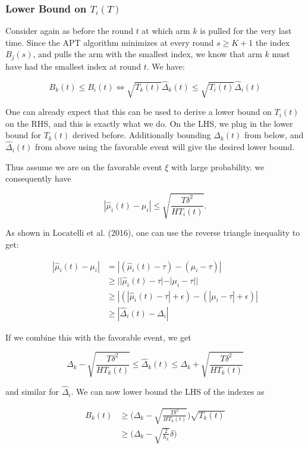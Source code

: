 \documentclass[11pt,]{article}
\begin{document}
\subsubsection{\texorpdfstring{Lower Bound on
\(T_i(T)\)}{Lower Bound on T\_i(T)}}\label{lower-bound-on-t_it}

Consider again as before the round \(t\) at which arm \(k\) is pulled
for the very last time. Since the APT algorithm minimizes at every round
\(s \geq K+1\) the index \(B_j(s)\), and pulls the arm with the smallest
index, we know that arm \(k\) must have had the smallest index at round
\(t\). We have:

\[
B_k(t) \leq B_i(t) \Leftrightarrow \sqrt{T_k(t)}\hat{\Delta}_k(t) \leq \sqrt{T_i(t)} \hat{\Delta}_i(t)
\]

One can already expect that this can be used to derive a lower bound on
\(T_i(t)\) on the RHS, and this is exactly what we do. On the LHS, we
plug in the lower bound for \(T_k(t)\) derived before. Additionally
bounding \(\Delta_k(t)\) from below, and \(\hat{\Delta}_i(t)\) from
above using the favorable event will give the desired lower bound.

Thus assume we are on the favorable event \(\xi\) with large
probability. we consequently have

\[
| \hat{\mu}_i(t) - \mu_i| \leq \sqrt{\frac{T\delta^2}{HT_i(t)}}.
\]

As shown in Locatelli et al. (2016), one can use the reverse triangle
inequality to get:

\begin{align*}
|\hat{\mu}_i(t) - \mu_i| & = |(\hat{\mu}_i(t) - \tau) - (\mu_i - \tau)| \\
& \geq || \hat{\mu}_i(t) - \tau | - |\mu_i - \tau|| \\
& \geq |(|\hat{\mu}_i(t) - \tau| + \epsilon) - (|\mu_i - \tau| + \epsilon)| \\
& \geq |\hat{\Delta}_i(t) - \Delta_i|
\end{align*}

If we combine this with the favorable event, we get

\[
\Delta_k - \sqrt{\frac{T\delta^2}{HT_k(t)}} \leq \hat{\Delta}_k(t) \leq \Delta_k + \sqrt{\frac{T\delta^2}{HT_k(t)}}
\]

and similar for \(\hat{\Delta}_i\). We can now lower bound the LHS of
the indexes as

\begin{align*}
B_k(t) & \geq \Big(\Delta_k - \sqrt{\frac{T\delta^2}{HT_k(t)}}\Big) \sqrt{T_k(t)} \\
& \geq \Big(\Delta_k - \sqrt{\frac{2}{h_k}}\delta \Big)
\end{align*}
\end{document}
